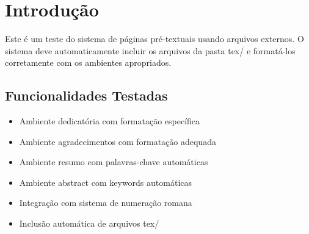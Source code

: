 \documentclass[mestrado,onehalfspacing]{UnB-PPGT}
\begin{document}
\pretextual
\folharosto


\textual

\chapter{Introdução}

Este é um teste do sistema de páginas pré-textuais usando arquivos externos. 
O sistema deve automaticamente incluir os arquivos da pasta tex/ e formatá-los 
corretamente com os ambientes apropriados.

\section{Funcionalidades Testadas}

\begin{itemize}
\item Ambiente dedicatória com formatação específica
\item Ambiente agradecimentos com formatação adequada
\item Ambiente resumo com palavras-chave automáticas
\item Ambiente abstract com keywords automáticas
\item Integração com sistema de numeração romana
\item Inclusão automática de arquivos tex/
\end{itemize}
\end{document}
